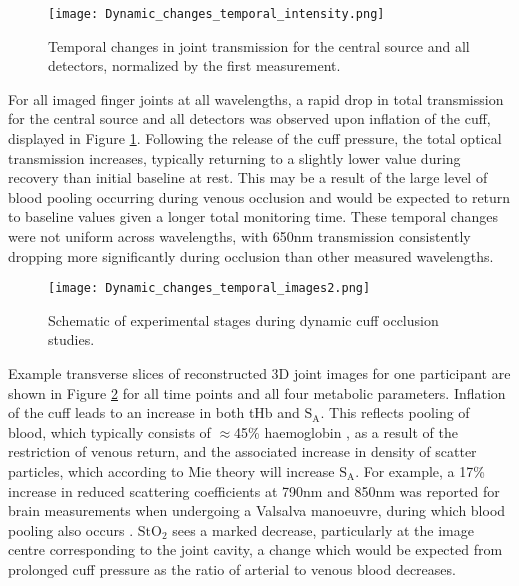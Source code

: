 \documentclass[twoside]{bhamthesis}
\theoremstyle{definition}
\begin{document}
\begin{figure}[!ht]
\centering\texttt{[image: Dynamic\_changes\_temporal\_intensity.png]}
\caption{Temporal changes in joint transmission for the central source and all detectors, normalized by the first measurement.}

\label{Dynamic_changes_temporal_intensity}
\end{figure}

For all imaged finger joints at all wavelengths, a rapid drop in total transmission for the central source and all detectors was observed upon inflation of the cuff, displayed in Figure \ref{Dynamic_changes_temporal_intensity}. Following the release of the cuff pressure, the total optical transmission increases, typically returning to a slightly lower value during recovery than initial baseline at rest. This may be a result of the large level of blood pooling occurring during venous occlusion and would be expected to return to baseline values given a longer total monitoring time. These temporal changes were not uniform across wavelengths, with 650nm transmission consistently dropping more significantly during occlusion than other measured wavelengths.

\begin{figure}[!ht]
\centering\texttt{[image: Dynamic\_changes\_temporal\_images2.png]}
\caption{Schematic of experimental stages during dynamic cuff occlusion studies.}
\label{Dynamic_changes_temporal_images}
\end{figure}

Example transverse slices of reconstructed 3D joint images for one participant are shown in Figure \ref{Dynamic_changes_temporal_images} for all time points and all four metabolic parameters. Inflation of the cuff leads to an increase in both tHb and $\mathrm{S_A}$. This reflects pooling of blood, which typically consists of $\approx$45\% haemoglobin \cite{brun2000paradox}, as a result of the restriction of venous return, and the associated increase in density of scatter particles, which according to Mie theory will increase $\mathrm{S_A}$. For example, a 17\% increase in reduced scattering coefficients at 790nm and 850nm was reported for brain measurements when undergoing a Valsalva manoeuvre, during which blood pooling also occurs \cite{gao2011effects}. $\mathrm{StO_2}$ sees a marked decrease, particularly at the image centre corresponding to the joint cavity, a change which would be expected from prolonged cuff pressure as the ratio of arterial to venous blood decreases.
\end{document}

